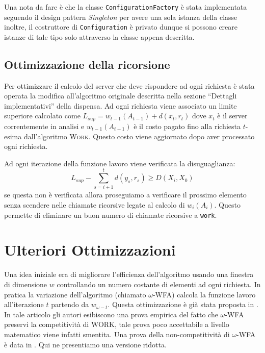 \documentclass[a4paper, 10pt]{article}
\begin{document}
Una nota da fare è che la classe \texttt{ConfigurationFactory} è stata 
implementata seguendo il design pattern \emph{Singleton} per avere una sola
istanza della classe inoltre, il costruttore di \texttt{Configuration} è 
privato dunque si possono creare istanze di tale tipo solo attraverso la 
classe appena descritta. 

\subsection{Ottimizzazione della ricorsione}
Per ottimizzare il calcolo del server che deve rispondere ad ogni richiesta 
è stata operata la modifica all'algoritmo originale descritta nella sezione
``Dettagli implementativi'' della dispensa. Ad ogni richiesta viene associato
un limite superiore calcolato come $L_{sup} = w_{t - 1}(A_{t - 1}) + d(x_t, r_t)$ 
dove $x_t$ è il server correntemente in analisi e $w_{t - 1}(A_{t - 1})$ è il
costo pagato fino alla richiesta $t$-esima dall'algoritmo \textsc{Work}. Questo
costo viene aggiornato dopo aver processato ogni richiesta. 

Ad ogni iterazione della funzione lavoro viene verificata la disuguaglianza:
\[
  L_{sup} - \sum_{s = i + 1}^{t} d(y_s, r_s) \geq D(X_i, X_0)
\]
se questa non è verificata allora proseguiamo a verificare il prossimo elemento
senza scendere nelle chiamate ricorsive legate al calcolo di $w_i(A_i)$. Questo
permette di eliminare un buon numero di chiamate ricorsive a \texttt{work}. 

\section{Ulteriori Ottimizzazioni}
Una idea iniziale era di migliorare l'efficienza dell'algoritmo usando una 
finestra di dimensione $w$ controllando un numero costante di elementi 
ad ogni richiesta. In pratica la variazione dell'algoritmo (chiamato $\omega$-WFA) 
calcola la funzione lavoro all'iterazione $t$ partendo da $w_{\omega - t}$. Questa 
ottimizzazione è già stata proposta in \cite{baumgartner}. In tale articolo 
gli autori esibiscono una prova empirica del fatto che $\omega$-WFA preservi la 
competitività di \textsc{WORK}, tale prova poco accettabile a livello matematico
viene infatti smentita. Una prova della non-competitività di $\omega$-WFA è data in
\cite{rudec}. Qui ne presentiamo una versione ridotta. 
\end{document}
